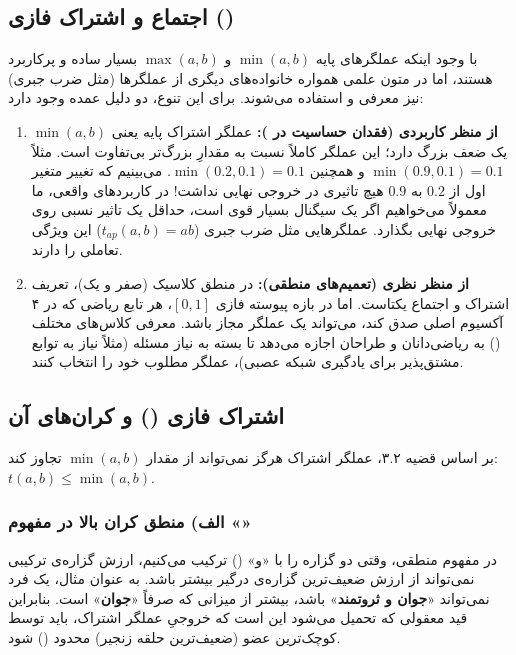 \documentclass{article}
\begin{document}
\subsection{اجتماع و اشتراک فازی ()}

با وجود اینکه عملگرهای پایه $\min(a,b)$ و $\max(a,b)$ بسیار ساده و پرکاربرد هستند، اما در متون علمی همواره خانواده‌های دیگری از عملگرها (مثل ضرب جبری) نیز معرفی و استفاده می‌شوند. برای این تنوع، دو دلیل عمده وجود دارد:

\begin{enumerate}
	\item \textbf{از منظر کاربردی (فقدان حساسیت در ):} عملگر اشتراک پایه یعنی $\min(a,b)$ یک ضعف بزرگ دارد؛ این عملگر کاملاً نسبت به مقدارِ بزرگ‌تر بی‌تفاوت است. مثلاً $\min(0.9, 0.1) = 0.1$ و همچنین $\min(0.2, 0.1) = 0.1$. می‌بینیم که تغییر متغیر اول از $0.2$ به $0.9$ هیچ تاثیری در خروجی نهایی نداشت! در کاربردهای واقعی، ما معمولاً می‌خواهیم اگر یک سیگنال بسیار قوی است، حداقل یک تاثیر نسبی روی خروجی نهایی بگذارد. عملگرهایی مثل ضرب جبری ($t_{ap}(a,b) = ab$) این ویژگی تعاملی را دارند.
	
	\item \textbf{از منظر نظری (تعمیم‌های منطقی):} در منطق کلاسیک (صفر و یک)، تعریف اشتراک و اجتماع یکتاست. اما در بازه پیوسته فازی $[0,1]$، هر تابع ریاضی که در ۴ آکسیوم اصلی صدق کند، می‌تواند یک عملگر مجاز باشد. معرفی کلاس‌های مختلف () به ریاضی‌دانان و طراحان اجازه می‌دهد تا بسته به نیاز مسئله (مثلاً نیاز به توابع مشتق‌پذیر برای یادگیری شبکه عصبی)، عملگر مطلوب خود را انتخاب کنند.
\end{enumerate}

\subsection{اشتراک فازی () و کران‌های آن}

بر اساس قضیه ۳.۲، عملگر اشتراک هرگز نمی‌تواند از مقدار $\min(a,b)$ تجاوز کند: $t(a,b) \le \min(a,b)$.

\subsubsection*{الف) منطق کران بالا در مفهوم «»}
در مفهوم منطقی، وقتی دو گزاره را با «و» () ترکیب می‌کنیم، ارزش گزاره‌ی ترکیبی نمی‌تواند از ارزش ضعیف‌ترین گزاره‌ی درگیر بیشتر باشد. به عنوان مثال، یک فرد نمی‌تواند «\textbf{جوان و ثروتمند}» باشد، بیشتر از میزانی که صرفاً «\textbf{جوان}» است. بنابراین قید معقولی که تحمیل می‌شود این است که خروجیِ عملگر اشتراک، باید توسط کوچک‌ترین عضو (ضعیف‌ترین حلقه زنجیر) محدود () شود.
\end{document}
